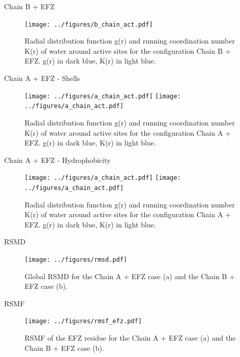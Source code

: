 \documentclass{beamer}
\begin{document}
\begin{frame}{Chain B + EFZ}
    \begin{figure}[H]
        \centering
        \texttt{[image: ../figures/b\_chain\_act.pdf]}
        \caption{Radial distribution function g(r) and running coordination number K(r) of water around active sites for the configuration Chain B + EFZ. g(r) in dark blue, K(r) in light blue.\label{fig:gofr_chain_b_efz}}
    \end{figure}
\end{frame}

\begin{frame}{Chain A + EFZ - Shells}
    \begin{figure}
        \centering
        \texttt{[image: ../figures/a\_chain\_act.pdf]}
        \texttt{[image: ../figures/a\_chain\_act.pdf]}
        \caption{Radial distribution function g(r) and running coordination number K(r) of water around active sites for the configuration Chain A + EFZ. g(r) in dark blue, K(r) in light blue.\label{fig:gofr_chain_a_efz_1}}
    \end{figure}
\end{frame}

\begin{frame}{Chain A + EFZ - Hydrophobicity}
    \begin{figure}
        \centering
        \texttt{[image: ../figures/a\_chain\_act.pdf]}
        \texttt{[image: ../figures/a\_chain\_act.pdf]}
        \caption{Radial distribution function g(r) and running coordination number K(r) of water around active sites for the configuration Chain A + EFZ. g(r) in dark blue, K(r) in light blue.\label{fig:gofr_chain_a_efz_2}}
    \end{figure}
\end{frame}
\begin{frame}{RSMD}
    \begin{figure}[H]
        \centering
        \texttt{[image: ../figures/rmsd.pdf]}
        \caption{Global RSMD for the Chain A + EFZ case (a) and the Chain B + EFZ case (b).\label{fig:rmsd}}
    \end{figure}
\end{frame}


\begin{frame}{RSMF}
    \begin{figure}[H]
        \centering
        \texttt{[image: ../figures/rmsf\_efz.pdf]}
        \caption{RSMF of the EFZ residue for the Chain A + EFZ case (a) and the Chain B + EFZ case (b).\label{fig:rmsf}}
    \end{figure}
\end{frame}
\end{document}
